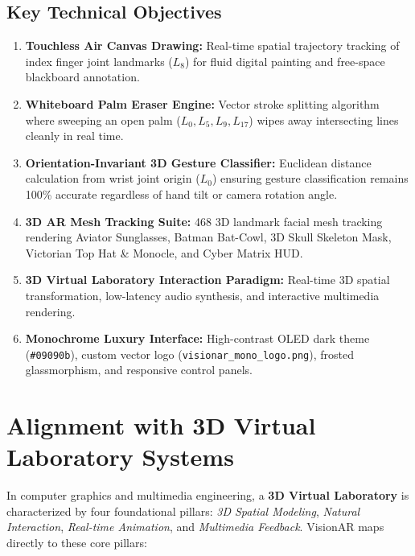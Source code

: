\documentclass[11pt,a4paper]{article}
\begin{document}
\subsection{Key Technical Objectives}
\begin{enumerate}
    \item \textbf{Touchless Air Canvas Drawing:} Real-time spatial trajectory tracking of index finger joint landmarks ($L_8$) for fluid digital painting and free-space blackboard annotation.
    \item \textbf{Whiteboard Palm Eraser Engine:} Vector stroke splitting algorithm where sweeping an open palm ($L_0, L_5, L_9, L_{17}$) wipes away intersecting lines cleanly in real time.
    \item \textbf{Orientation-Invariant 3D Gesture Classifier:} Euclidean distance calculation from wrist joint origin ($L_0$) ensuring gesture classification remains 100\% accurate regardless of hand tilt or camera rotation angle.
    \item \textbf{3D AR Mesh Tracking Suite:} 468 3D landmark facial mesh tracking rendering Aviator Sunglasses, Batman Bat-Cowl, 3D Skull Skeleton Mask, Victorian Top Hat \& Monocle, and Cyber Matrix HUD.
    \item \textbf{3D Virtual Laboratory Interaction Paradigm:} Real-time 3D spatial transformation, low-latency audio synthesis, and interactive multimedia rendering.
    \item \textbf{Monochrome Luxury Interface:} High-contrast OLED dark theme (\texttt{\#09090b}), custom vector logo (\texttt{visionar\_mono\_logo.png}), frosted glassmorphism, and responsive control panels.
\end{enumerate}

\section{Alignment with 3D Virtual Laboratory Systems}
In computer graphics and multimedia engineering, a \textbf{3D Virtual Laboratory} is characterized by four foundational pillars: \textit{3D Spatial Modeling}, \textit{Natural Interaction}, \textit{Real-time Animation}, and \textit{Multimedia Feedback}. VisionAR maps directly to these core pillars:
\end{document}
